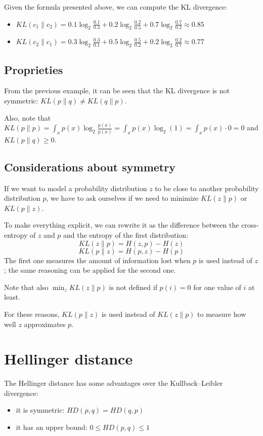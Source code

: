 Given the formula presented above, we can compute the KL divergence:
\begin{itemize}
    \item $\mathit{KL}(c_1 \| c_2) = 0.1 \log_2 \frac{0.1}{0.3} + 0.2 \log_2 \frac{0.2}{0.5} + 0.7 \log_2 \frac{0.7}{0.2} \approx 0.85$
    \item $\mathit{KL}(c_2 \| c_1) = 0.3 \log_2 \frac{0.3}{0.1} + 0.5 \log_2 \frac{0.5}{0.2} + 0.2 \log_2 \frac{0.2}{0.7} \approx 0.77$
\end{itemize}


\subsection{Proprieties}
From the previous example, it can be seen that the KL divergence is not symmetric: $\mathit{KL}(p \| q) \neq \mathit{KL}(q \| p)$.

Also, note that $\mathit{KL}(p \| p) = \int_x p(x) \log_2 \frac{p(x)}{p(x)} = \int_x p(x) \log_2 (1) = \int_x p(x) \cdot 0 = 0$
and $\mathit{KL}(p \| q) \geq 0$.

\subsection{Considerations about symmetry}

If we want to model a probability distribution $z$ to be close to another probability distribution $p$, we have to ask ourselves if we need to minimize $\mathit{KL}(z \| p)$ or $\mathit{KL}(p \| z)$.

To make everything explicit, we can rewrite it as the difference between the cross-entropy of $z$ and $p$ and the entropy of the first distribution:
$$ \mathit{KL}(z \| p) = H(z, p) - H(z)$$
$$ \mathit{KL}(p \| z) = H(p, z) - H(p)$$
The first one measures the amount of information lost when $p$ is used instead of $z$; the same reasoning can be applied for the second one.

Note that also $\min_{z} \mathit{KL}(z \| p)$ is not defined if $p(i)=0$ for one value of $i$ at least.

For these reasons, $\mathit{KL}(p \| z)$ is used instead of $\mathit{KL}(z \| p)$ to measure how well $z$ approximates $p$.

\section{Hellinger distance}
The Hellinger distance has some advantages over the Kullback–Leibler divergence:
\begin{itemize}
    \item it is symmetric: $\mathit{HD}(p, q) = \mathit{HD}(q, p)$
    \item it has an upper bound: $0 \leq \mathit{HD}(p, q) \leq 1$
\end{itemize}

